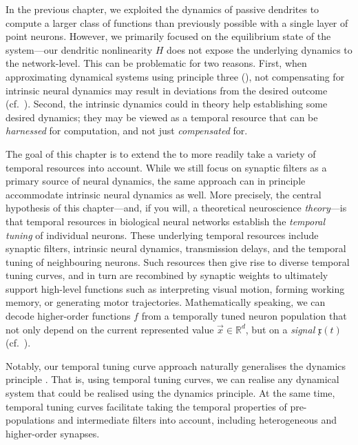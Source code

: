 
In the previous chapter, we exploited the dynamics of passive dendrites to compute a larger class of functions than previously possible with a single layer of point neurons.
However, we primarily focused on the equilibrium state of the \nlif system---our dendritic nonlinearity $H$ does not expose the underlying dynamics to the network-level.
This can be problematic for two reasons.
First, when approximating dynamical systems using \NEF principle three (), not compensating for intrinsic neural dynamics may result in deviations from the desired outcome (cf.~).
Second, the intrinsic dynamics could in theory help establishing some desired dynamics; they may be viewed as a temporal resource that can be \emph{harnessed} for computation, and not just \emph{compensated} for.

The goal of this chapter is to extend the \NEF to more readily take a variety of temporal resources into account.
While we still focus on synaptic filters as a primary source of neural dynamics, the same approach can in principle accommodate intrinsic neural dynamics as well.
More precisely, the central hypothesis of this chapter---and, if you will, a theoretical neuroscience \emph{theory}---is that temporal resources in biological neural networks establish the \emph{temporal tuning} of individual neurons.
These underlying temporal resources include synaptic filters, intrinsic neural dynamics, transmission delays, and the temporal tuning of neighbouring neurons.
Such resources then give rise to diverse temporal tuning curves, and in turn are recombined by synaptic weights to ultimately support high-level functions such as interpreting visual motion, forming working memory, or generating motor trajectories.
Mathematically speaking, we can decode higher-order functions $f$ from a temporally tuned neuron population that not only depend on the current represented value $\vec x \in \mathbb{R}^d$, but on a \emph{signal} $\mathfrak{x}(t)$ (cf.~).

Notably, our temporal tuning curve approach naturally generalises the \NEF dynamics principle \citep[Chapter~8]{eliasmith2003neural}.
That is, using temporal tuning curves, we can realise any dynamical system that could be realised using the dynamics principle.
At the same time, temporal tuning curves facilitate taking the temporal properties of pre-populations and intermediate filters into account, including heterogeneous and higher-order synapses.


